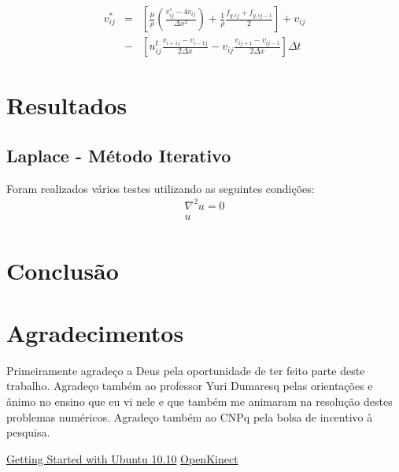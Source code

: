 \documentclass[journal]{IEEEtran}
\begin{document}
\begin{eqnarray}
v_{ij}^{*}&=&\left[\frac{\mu}{\rho}\left(\frac{v_{ij}^s-4v_{ij}}{\Delta
x^2}\right)+\frac{1}{\rho}\frac{f_{y,ij}+f_{y,ij-1}}{2}\right] + v_{ij}\nonumber \\
&-&\left[u_{ij}^t\frac{v_{i+1j}-v_{i-1j}}{2\Delta
x}-v_{ij}\frac{v_{ij+1}-v_{ij-1}}{2\Delta x}\right]\Delta t
\end{eqnarray}
\section{Resultados}
\subsection{Laplace - Método Iterativo}
Foram realizados vários testes utilizando as seguintes condições:
\begin{eqnarray}
\nabla^2 u=0\\
u_{}
\end{eqnarray}

\section{Conclusão}

\section*{Agradecimentos}

Primeiramente agradeço a Deus pela oportunidade de ter feito parte deste trabalho. Agradeço também ao professor Yuri Dumaresq pelas orientações e ânimo no ensino que eu vi nele e que também me animaram na resolução destes problemas numéricos. Agradeço também ao CNPq pela bolsa de incentivo à pesquisa.

\begin{thebibliography}{4}
  
 \href{ftp://ftp.fisio.cinvestav.mx/Manuales/linux/Getting\%20Started\%20with\%20Ubuntu\%2010.10.pdf}{Getting Started with Ubuntu 10.10}
 \href{http://openkinect.org/wiki/Main_Page}{OpenKinect}
\end{thebibliography}
\end{document}
